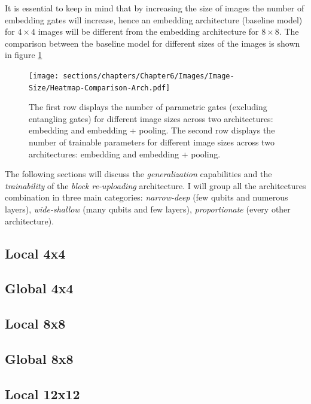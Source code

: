 It is essential to keep in mind that by increasing the size of images the number of embedding gates will
increase, hence an embedding architecture (baseline model) for $4\times4$ images will be different 
from the embedding architecture for $8\times8$.
The comparison between the baseline model for different sizes of the images is shown in figure 
\ref{arc:embed-pooling}

\begin{figure}[h]
    \centering
    \texttt{[image: sections/chapters/Chapter6/Images/Image-Size/Heatmap-Comparison-Arch.pdf]}
    \caption{The first row displays the number of parametric gates (excluding entangling gates) for 
    different image sizes across two architectures: embedding and embedding + pooling.
    The second row displays the number of trainable parameters for 
    different image sizes across two architectures: embedding and embedding + pooling.}
    \label{arc:embed-pooling}
\end{figure}


The following sections will discuss the \textit{generalization} capabilities and the 
\textit{trainability} of the \textit{block re-uploading} architecture.
I will group all the architectures combination in three main categories: \textit{narrow-deep} 
(few qubits and numerous layers), \textit{wide-shallow} (many qubits and few layers), \textit{proportionate}
(every other architecture). 


\subsection{Local 4x4}


\subsection{Global 4x4}


\subsection{Local 8x8} \label{sssec:num1}


\subsection{Global 8x8}


\subsection{Local 12x12}


